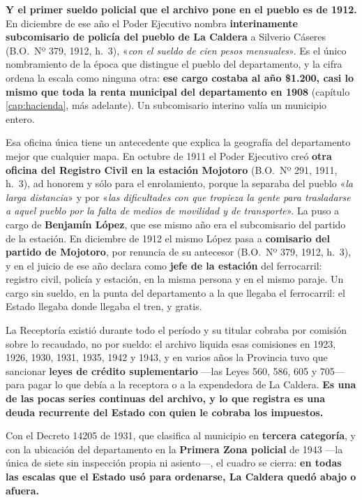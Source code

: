 \textbf{Y el primer sueldo policial que el archivo pone en el pueblo es de 1912.} En diciembre de
ese año el Poder Ejecutivo nombra \textbf{interinamente subcomisario de policía del pueblo de La
Caldera} a Silverio Cáseres (B.O.\ Nº 379, 1912, h.\ 3), «\textit{con el sueldo de cien pesos mensuales}». Es el único
nombramiento de la época que distingue el pueblo del departamento, y la cifra ordena la escala
como ninguna otra: \textbf{ese cargo costaba al año \$1.200, casi lo mismo que toda la renta
municipal del departamento en 1908} (capítulo \ref{cap:hacienda}, más adelante). Un subcomisario interino valía
un municipio entero.

Esa oficina única tiene un antecedente que explica la geografía del departamento mejor que
cualquier mapa. En octubre de 1911 el Poder Ejecutivo creó \textbf{otra oficina del Registro
Civil en la estación Mojotoro} (B.O.\ Nº 291, 1911, h.\ 3), ad honorem y sólo para el enrolamiento, porque la separaba del
pueblo «\textit{la larga distancia}» y por «\textit{las dificultades con que tropieza la gente
para trasladarse a aquel pueblo por la falta de medios de movilidad y de transporte}». La puso a
cargo de \textbf{Benjamín López}, que ese mismo año era el subcomisario
del partido de la estación. En diciembre de 1912 el mismo López pasa a \textbf{comisario del
partido de Mojotoro}, por renuncia de su antecesor (B.O.\ Nº 379, 1912, h.\ 3), y en el juicio
de ese año declara como \textbf{jefe de la estación} del ferrocarril: registro civil, policía y
estación, en la misma persona y en el mismo paraje. Un cargo sin sueldo, en la punta del departamento a la que llegaba el ferrocarril:
el Estado llegaba donde llegaba el tren, y gratis.

La Receptoría existió durante todo el período y su titular cobraba por comisión sobre lo
recaudado, no por sueldo: el archivo liquida esas comisiones en 1923, 1926, 1930, 1931, 1935,
1942 y 1943, y en varios años la Provincia tuvo que sancionar \textbf{leyes de crédito
suplementario} ---las Leyes 560, 586, 605 y 705--- para pagar lo que debía a la receptora o a la
expendedora de La Caldera. \textbf{Es una de las pocas series continuas del archivo, y lo que
registra es una deuda recurrente del Estado con quien le cobraba los impuestos.}

Con el Decreto 14205 de 1931, que clasifica al municipio en \textbf{tercera categoría}, y con la
ubicación del departamento en la \textbf{Primera Zona policial} de 1943 ---la única de siete sin
inspección propia ni asiento---, el cuadro se cierra: \textbf{en todas las escalas que el Estado
usó para ordenarse, La Caldera quedó abajo o afuera.}

